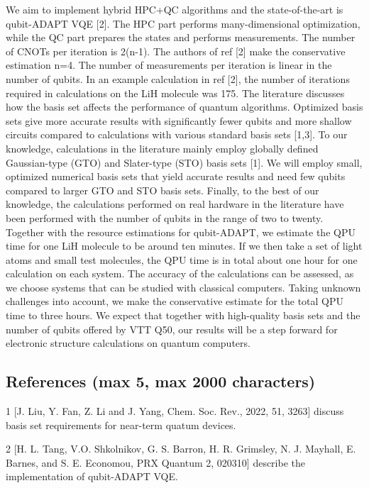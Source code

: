 \documentclass[english,a4paper,12pt]{article}
\begin{document}
We aim to implement hybrid HPC+QC algorithms and the state-of-the-art is qubit-ADAPT VQE [2]. The HPC part performs many-dimensional optimization, while the QC part prepares the states and performs measurements. The number of CNOTs per iteration is 2(n-1). The authors of ref [2] make the conservative estimation n=4. The number of measurements per iteration is linear in the number of qubits. In an example calculation in ref [2], the number of iterations required in calculations on the LiH molecule was 175. The literature discusses how the basis set affects the performance of quantum algorithms. Optimized basis sets give more accurate results with significantly fewer qubits and more shallow circuits compared to calculations with various standard basis sets [1,3]. To our knowledge, calculations in the literature mainly employ globally defined Gaussian-type (GTO) and Slater-type (STO) basis sets [1]. We will employ small, optimized numerical basis sets that yield accurate results and need few qubits compared to larger GTO and STO basis sets. Finally, to the best of our knowledge, the calculations performed on real hardware in the literature have been performed with the number of qubits in the range of two to twenty. Together with the resource estimations for qubit-ADAPT, we estimate the QPU time for one LiH molecule to be around ten minutes. If we then take a set of light atoms and small test molecules, the QPU time is in total about one hour for one calculation on each system. The accuracy of the calculations can be assessed, as we choose systems that can be studied with classical computers. Taking unknown challenges into account, we make the conservative estimate for the total QPU time to three hours. We expect that together with high-quality basis sets and the number of qubits offered by VTT Q50, our results will be a step forward for electronic structure calculations on quantum computers.

\subsection{References (max 5, max 2000 characters)}

1 [J. Liu, Y. Fan, Z. Li and J. Yang, Chem. Soc. Rev., 2022, 51, 3263] discuss basis set requirements for near-term quatum devices.

2 [H. L. Tang, V.O. Shkolnikov, G. S. Barron, H. R. Grimsley, N. J. Mayhall, E. Barnes, and S. E. Economou, PRX Quantum 2, 020310] describe the implementation of qubit-ADAPT VQE. 
\end{document}
